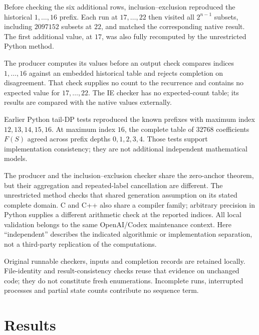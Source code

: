 \documentclass[11pt]{article}
\theoremstyle{definition}
\theoremstyle{remark}
\begin{document}
Before checking the six additional rows, inclusion--exclusion reproduced the
historical $1,\ldots,16$ prefix. Each run at $17,\ldots,22$ then visited
all $2^{n-1}$ subsets, including $2097152$ subsets at $22$, and matched
the corresponding native result. The first additional value, at $17$,
was also fully recomputed by the unrestricted Python method.

The producer computes its values before an output check compares indices
$1,\ldots,16$ against an embedded historical table and rejects completion
on disagreement. That check supplies no count to the recurrence and contains
no expected value for $17,\ldots,22$. The IE checker has no expected-count
table; its results are compared with the native values externally.

Earlier Python tail-DP tests reproduced the known prefixes with maximum
index $12,13,14,15,16$. At maximum index $16$, the complete table of
$32768$ coefficients $F(S)$ agreed across prefix depths $0,1,2,3,4$.
Those tests support implementation consistency;
they are not additional independent mathematical models.

The producer and the inclusion--exclusion checker share the zero-anchor
theorem, but their aggregation and repeated-label cancellation are different.
The unrestricted method checks that shared generation assumption on its
stated complete domain. C and C++ also share a compiler family; arbitrary
precision in Python supplies a different arithmetic check at the reported
indices. All local validation belongs to the same OpenAI/Codex maintenance
context. Here ``independent'' describes the indicated algorithmic or
implementation separation, not a third-party replication of the computations.

Original runnable checkers, inputs and completion records are retained
locally. File-identity and result-consistency checks reuse that evidence on
unchanged code; they do not constitute fresh enumerations. Incomplete runs,
interrupted processes and partial state counts contribute no sequence term.

\section{Results}
\label{sec:results}
\end{document}
